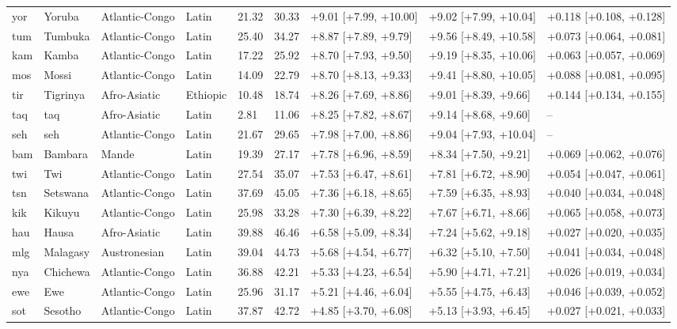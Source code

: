 {\begin{longtable}{@{}lllllrlll@{}}
yor & Yoruba & Atlantic-Congo & Latin & 21.32 & 30.33 & +9.01 [+7.99, +10.00] & +9.02 [+7.99, +10.04] & +0.118 [+0.108, +0.128] \\
tum & Tumbuka & Atlantic-Congo & Latin & 25.40 & 34.27 & +8.87 [+7.89, +9.79] & +9.56 [+8.49, +10.58] & +0.073 [+0.064, +0.081] \\
kam & Kamba & Atlantic-Congo & Latin & 17.22 & 25.92 & +8.70 [+7.93, +9.50] & +9.19 [+8.35, +10.06] & +0.063 [+0.057, +0.069] \\
mos & Mossi & Atlantic-Congo & Latin & 14.09 & 22.79 & +8.70 [+8.13, +9.33] & +9.41 [+8.80, +10.05] & +0.088 [+0.081, +0.095] \\
tir & Tigrinya & Afro-Asiatic & Ethiopic & 10.48 & 18.74 & +8.26 [+7.69, +8.86] & +9.01 [+8.39, +9.66] & +0.144 [+0.134, +0.155] \\
taq & taq & Afro-Asiatic & Latin & 2.81 & 11.06 & +8.25 [+7.82, +8.67] & +9.14 [+8.68, +9.60] & -- \\
seh & seh & Atlantic-Congo & Latin & 21.67 & 29.65 & +7.98 [+7.00, +8.86] & +9.04 [+7.93, +10.04] & -- \\
bam & Bambara & Mande & Latin & 19.39 & 27.17 & +7.78 [+6.96, +8.59] & +8.34 [+7.50, +9.21] & +0.069 [+0.062, +0.076] \\
twi & Twi & Atlantic-Congo & Latin & 27.54 & 35.07 & +7.53 [+6.47, +8.61] & +7.81 [+6.72, +8.90] & +0.054 [+0.047, +0.061] \\
tsn & Setswana & Atlantic-Congo & Latin & 37.69 & 45.05 & +7.36 [+6.18, +8.65] & +7.59 [+6.35, +8.93] & +0.040 [+0.034, +0.048] \\
kik & Kikuyu & Atlantic-Congo & Latin & 25.98 & 33.28 & +7.30 [+6.39, +8.22] & +7.67 [+6.71, +8.66] & +0.065 [+0.058, +0.073] \\
hau & Hausa & Afro-Asiatic & Latin & 39.88 & 46.46 & +6.58 [+5.09, +8.34] & +7.24 [+5.62, +9.18] & +0.027 [+0.020, +0.035] \\
mlg & Malagasy & Austronesian & Latin & 39.04 & 44.73 & +5.68 [+4.54, +6.77] & +6.32 [+5.10, +7.50] & +0.041 [+0.034, +0.048] \\
nya & Chichewa & Atlantic-Congo & Latin & 36.88 & 42.21 & +5.33 [+4.23, +6.54] & +5.90 [+4.71, +7.21] & +0.026 [+0.019, +0.034] \\
ewe & Ewe & Atlantic-Congo & Latin & 25.96 & 31.17 & +5.21 [+4.46, +6.04] & +5.55 [+4.75, +6.43] & +0.046 [+0.039, +0.052] \\
sot & Sesotho & Atlantic-Congo & Latin & 37.87 & 42.72 & +4.85 [+3.70, +6.08] & +5.13 [+3.93, +6.45] & +0.027 [+0.021, +0.033] \\

\end{longtable}}
